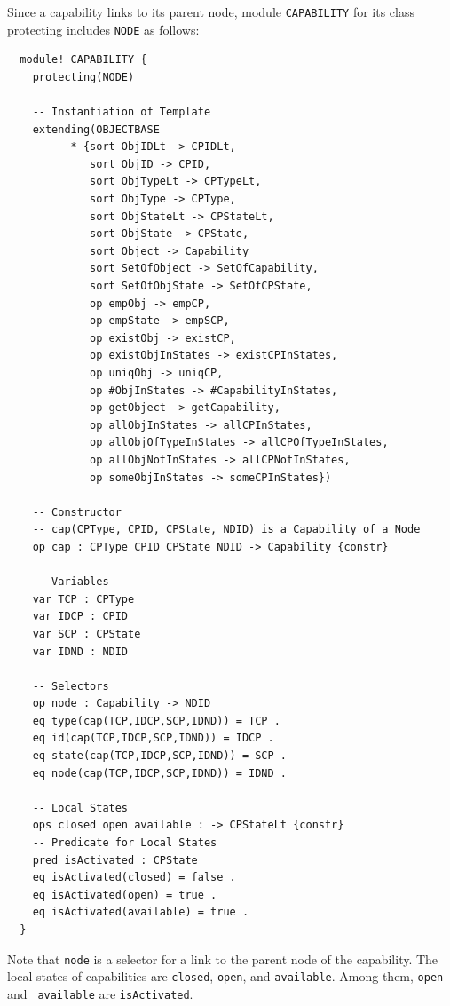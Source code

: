 \documentclass[12pt]{report}
\begin{document}
Since a capability links to its parent node, module {\tt CAPABILITY} for
its class protecting includes {\tt NODE} as follows:
\small
\begin{verbatim}
  module! CAPABILITY {
    protecting(NODE)
  
    -- Instantiation of Template
    extending(OBJECTBASE
          * {sort ObjIDLt -> CPIDLt,
             sort ObjID -> CPID,
             sort ObjTypeLt -> CPTypeLt,
             sort ObjType -> CPType,
             sort ObjStateLt -> CPStateLt,
             sort ObjState -> CPState,
             sort Object -> Capability
             sort SetOfObject -> SetOfCapability,
             sort SetOfObjState -> SetOfCPState,
             op empObj -> empCP,
             op empState -> empSCP,
             op existObj -> existCP,
             op existObjInStates -> existCPInStates,
             op uniqObj -> uniqCP,
             op #ObjInStates -> #CapabilityInStates,
             op getObject -> getCapability,
             op allObjInStates -> allCPInStates,
             op allObjOfTypeInStates -> allCPOfTypeInStates,
             op allObjNotInStates -> allCPNotInStates,
             op someObjInStates -> someCPInStates})
  
    -- Constructor
    -- cap(CPType, CPID, CPState, NDID) is a Capability of a Node
    op cap : CPType CPID CPState NDID -> Capability {constr}
  
    -- Variables
    var TCP : CPType
    var IDCP : CPID
    var SCP : CPState
    var IDND : NDID
  
    -- Selectors
    op node : Capability -> NDID
    eq type(cap(TCP,IDCP,SCP,IDND)) = TCP .
    eq id(cap(TCP,IDCP,SCP,IDND)) = IDCP .
    eq state(cap(TCP,IDCP,SCP,IDND)) = SCP .
    eq node(cap(TCP,IDCP,SCP,IDND)) = IDND .
  
    -- Local States
    ops closed open available : -> CPStateLt {constr}
    -- Predicate for Local States
    pred isActivated : CPState
    eq isActivated(closed) = false .
    eq isActivated(open) = true .
    eq isActivated(available) = true .
  }
\end{verbatim}
\normalsize
Note that {\tt node} is a selector for a link to the parent node of
the capability. The local states of capabilities are {\tt closed},
{\tt open}, and {\tt available}. Among them, {\tt open} and {\tt
  available} are {\tt isActivated}.
\end{document}
